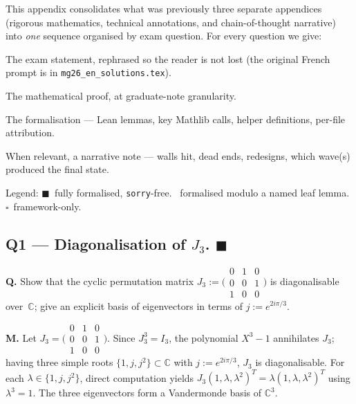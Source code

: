 \documentclass[11pt,a4paper]{article}
\newcommand{\done}[1]{\textcolor{donegreen}{\textbf{#1}}}
\newcommand{\todoc}[1]{\textcolor{todoamber}{\textbf{#1}}}
\newcommand{\stub}[1]{\textcolor{stubred}{\textbf{#1}}}
\newcommand{\cmd}[1]{\texttt{\small #1}}
\newcommand{\C}{\mathbb{C}}
\theoremstyle{plain}
\theoremstyle{definition}
\begin{document}
This appendix consolidates what was previously three separate
appendices (rigorous mathematics, technical annotations, and
chain-of-thought narrative) into \emph{one} sequence organised by
exam question. For every question we give:
\begin{description}[leftmargin=1em]
\item[Q.] The exam statement, rephrased so the reader is not
      lost (the original French prompt is in \cmd{mg26\_en\_solutions.tex}).
\item[M.] The mathematical proof, at graduate-note granularity.
\item[F.] The formalisation --- Lean lemmas, key Mathlib calls,
      helper definitions, per-file attribution.
\item[N.] When relevant, a narrative note --- walls hit, dead
      ends, redesigns, which wave(s) produced the final state.
\end{description}

Legend: \done{$\blacksquare$}~fully formalised, \cmd{sorry}-free.
\todoc{\textopenbullet}~formalised modulo a named leaf lemma.
\stub{$\square$}~framework-only.

\subsection{Q1 --- Diagonalisation of \texorpdfstring{$J_3$}{J3}. \done{$\blacksquare$}}

\textbf{Q.} Show that the cyclic permutation matrix
$J_3 := \bigl(\begin{smallmatrix}0&1&0\\0&0&1\\1&0&0\end{smallmatrix}\bigr)$
is diagonalisable over~$\C$; give an explicit basis of eigenvectors
in terms of $j := e^{2i\pi/3}$.

\textbf{M.} Let $J_3 = \bigl(\begin{smallmatrix}0&1&0\\0&0&1\\1&0&0\end{smallmatrix}\bigr)$.
Since $J_3^3 = I_3$, the polynomial $X^3 - 1$ annihilates $J_3$;
having three simple roots $\{1, j, j^2\} \subset \C$ with
$j := e^{2i\pi/3}$, $J_3$ is diagonalisable. For each
$\lambda \in \{1, j, j^2\}$, direct computation yields
$J_3 (1, \lambda, \lambda^2)^T = \lambda (1, \lambda, \lambda^2)^T$
using $\lambda^3 = 1$. The three eigenvectors form a Vandermonde
basis of $\C^3$.
\end{document}
